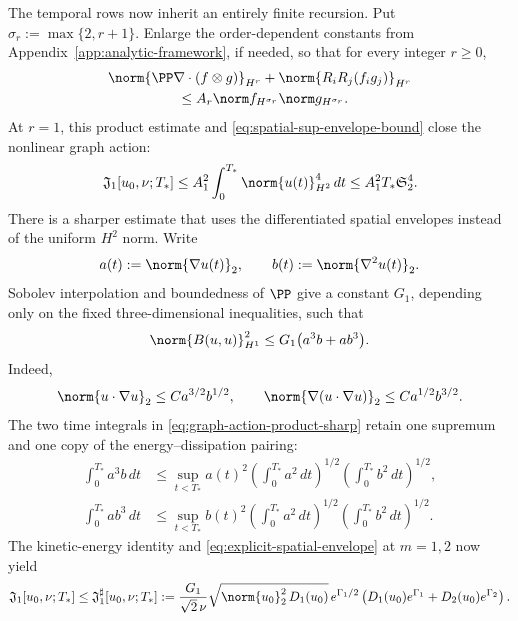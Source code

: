 The temporal rows now inherit an entirely finite recursion.  Put
\(\sigma_r:=\max\{2,r+1\}\).  Enlarge the order-dependent constants from
Appendix~\ref{app:analytic-framework}, if needed, so that for every integer
\(r\ge0\),
\begin{equation}
 \begin{aligned}
 &\norm{\PP\nabla\cdot(f\otimes g)}_{H^r}
 +\norm{R_iR_j(f_i g_j)}_{H^r}\\
 &\hspace{5em}\le
 A_r\norm f_{H^{\sigma_r}}\norm g_{H^{\sigma_r}}.
 \end{aligned}
 \label{eq:row-product-constant}
\end{equation}
At \(r=1\), this product estimate and
\eqref{eq:spatial-sup-envelope-bound} close the nonlinear graph action:
\begin{equation}
 \mathfrak J_1[u_0,\nu;T_*]
 \le A_1^2\int_0^{T_*}\norm{u(t)}_{H^2}^4\,dt
 \le A_1^2T_*\mathfrak S_2^4.
 \label{eq:critical-current-to-graph-action}
\end{equation}
There is a sharper estimate that uses the differentiated spatial envelopes
instead of the uniform \(H^2\) norm.  Write
\[
 a(t):=\norm{\nabla u(t)}_2,
 \qquad
 b(t):=\norm{\nabla^2u(t)}_2.
\]
Sobolev interpolation and boundedness of \(\PP\) give a constant \(G_1\),
depending only on the fixed three-dimensional inequalities, such that
\begin{equation}
 \norm{B(u,u)}_{H^1}^2
 \le G_1\bigl(a^3b+ab^3\bigr).
 \label{eq:graph-action-product-sharp}
\end{equation}
Indeed,
\[
 \norm{u\cdot\nabla u}_2
 \le C a^{3/2}b^{1/2},
 \qquad
 \norm{\nabla(u\cdot\nabla u)}_2
 \le C a^{1/2}b^{3/2}.
\]
The two time integrals in \eqref{eq:graph-action-product-sharp} retain one
supremum and one copy of the energy--dissipation pairing:
\begin{align*}
 \int_0^{T_*}a^3b\,dt
 &\le \sup_{t<T_*}a(t)^2
       \left(\int_0^{T_*}a^2\,dt\right)^{1/2}
       \left(\int_0^{T_*}b^2\,dt\right)^{1/2},\\
 \int_0^{T_*}ab^3\,dt
 &\le \sup_{t<T_*}b(t)^2
       \left(\int_0^{T_*}a^2\,dt\right)^{1/2}
       \left(\int_0^{T_*}b^2\,dt\right)^{1/2}.
\end{align*}
The kinetic-energy identity and
\eqref{eq:explicit-spatial-envelope} at \(m=1,2\) now yield
\begin{equation}
 \mathfrak J_1[u_0,\nu;T_*]
 \le \mathfrak J_1^{\sharp}[u_0,\nu;T_*]
 :=\frac{G_1}{\sqrt2\,\nu}
 \sqrt{\norm{u_0}_2^2\,D_1(u_0)}\,e^{\Gamma_1/2}
 \left(D_1(u_0)e^{\Gamma_1}+D_2(u_0)e^{\Gamma_2}\right).
 \label{eq:graph-action-critical-sharp}
\end{equation}
